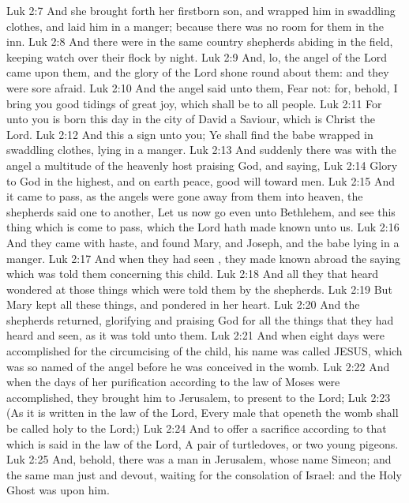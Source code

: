 \vs Luk 2:7 And she brought forth her firstborn son, and wrapped him in swaddling clothes, and laid him in a manger; because there was no room for them in the inn.
\vs Luk 2:8 And there were in the same country shepherds abiding in the field, keeping watch over their flock by night.
\vs Luk 2:9 And, lo, the angel of the Lord came upon them, and the glory of the Lord shone round about them: and they were sore afraid.
\vs Luk 2:10 And the angel said unto them, Fear not: for, behold, I bring you good tidings of great joy, which shall be to all people.
\vs Luk 2:11 For unto you is born this day in the city of David a Saviour, which is Christ the Lord.
\vs Luk 2:12 And this  a sign unto you; Ye shall find the babe wrapped in swaddling clothes, lying in a manger.
\vs Luk 2:13 And suddenly there was with the angel a multitude of the heavenly host praising God, and saying,
\vs Luk 2:14 Glory to God in the highest, and on earth peace, good will toward men.
\vs Luk 2:15 And it came to pass, as the angels were gone away from them into heaven, the shepherds said one to another, Let us now go even unto Bethlehem, and see this thing which is come to pass, which the Lord hath made known unto us.
\vs Luk 2:16 And they came with haste, and found Mary, and Joseph, and the babe lying in a manger.
\vs Luk 2:17 And when they had seen , they made known abroad the saying which was told them concerning this child.
\vs Luk 2:18 And all they that heard  wondered at those things which were told them by the shepherds.
\vs Luk 2:19 But Mary kept all these things, and pondered  in her heart.
\vs Luk 2:20 And the shepherds returned, glorifying and praising God for all the things that they had heard and seen, as it was told unto them.
\vs Luk 2:21 And when eight days were accomplished for the circumcising of the child, his name was called JESUS, which was so named of the angel before he was conceived in the womb.
\vs Luk 2:22 And when the days of her purification according to the law of Moses were accomplished, they brought him to Jerusalem, to present  to the Lord;
\vs Luk 2:23 (As it is written in the law of the Lord, Every male that openeth the womb shall be called holy to the Lord;)
\vs Luk 2:24 And to offer a sacrifice according to that which is said in the law of the Lord, A pair of turtledoves, or two young pigeons.
\vs Luk 2:25 And, behold, there was a man in Jerusalem, whose name  Simeon; and the same man  just and devout, waiting for the consolation of Israel: and the Holy Ghost was upon him.
